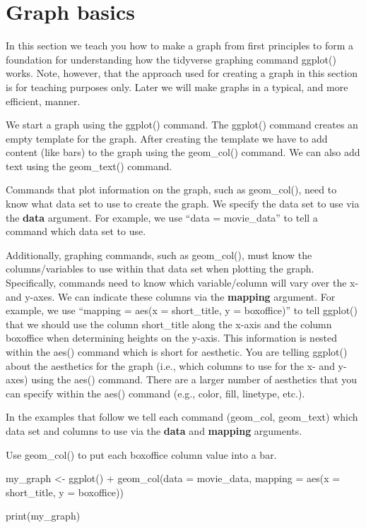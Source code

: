 \documentclass[
]{krantz}
\makeatletter
\newenvironment{Shaded}{\begin{snugshade}}{\end{snugshade}}
\newcommand{\AttributeTok}[1]{\textcolor[rgb]{0.61,0.61,0.61}{#1}}
\newcommand{\FunctionTok}[1]{\textcolor[rgb]{0,0,0}{#1}}
\newcommand{\NormalTok}[1]{#1}
\newcommand{\OtherTok}[1]{\textcolor[rgb]{0.37,0.37,0.37}{#1}}
\newcommand{\SpecialCharTok}[1]{\textcolor[rgb]{0,0,0}{#1}}
\newenvironment{kframe}{%
\medskip{}
\setlength{\fboxsep}{.8em}
 \def\at@end@of@kframe{}%
 \ifinner\ifhmode%
  \def\at@end@of@kframe{\end{minipage}}%
  \begin{minipage}{\columnwidth}%
 \fi\fi%
 \def\FrameCommand##1{\hskip\@totalleftmargin \hskip-\fboxsep
 \colorbox{shadecolor}{##1}\hskip-\fboxsep
     \hskip-\linewidth \hskip-\@totalleftmargin \hskip\columnwidth}%
 \MakeFramed {\advance\hsize-\width
   \@totalleftmargin\z@ \linewidth\hsize
   \@setminipage}}%
 {\par\unskip\endMakeFramed%
 \at@end@of@kframe}
\renewenvironment{Shaded}{\begin{kframe}}{\end{kframe}}
\makeatother
\begin{document}
\hypertarget{graph-basics}{%
\section{Graph basics}\label{graph-basics}}

In this section we teach you how to make a graph from first principles to form a foundation for understanding how the tidyverse graphing command ggplot() works. Note, however, that the approach used for creating a graph in this section is for teaching purposes only. Later we will make graphs in a typical, and more efficient, manner.

We start a graph using the ggplot() command. The ggplot() command creates an empty template for the graph. After creating the template we have to add content (like bars) to the graph using the geom\_col() command. We can also add text using the geom\_text() command.

Commands that plot information on the graph, such as geom\_col(), need to know what data set to use to create the graph. We specify the data set to use via the \textbf{data} argument. For example, we use ``data = movie\_data'' to tell a command which data set to use.

Additionally, graphing commands, such as geom\_col(), must know the columns/variables to use within that data set when plotting the graph. Specifically, commands need to know which variable/column will vary over the x- and y-axes. We can indicate these columns via the \textbf{mapping} argument. For example, we use ``mapping = aes(x = short\_title, y = boxoffice)'' to tell ggplot() that we should use the column short\_title along the x-axis and the column boxoffice when determining heights on the y-axis. This information is nested within the aes() command which is short for aesthetic. You are telling ggplot() about the aesthetics for the graph (i.e., which columns to use for the x- and y-axes) using the aes() command. There are a larger number of aesthetics that you can specify within the aes() command (e.g., color, fill, linetype, etc.).

In the examples that follow we tell each command (geom\_col, geom\_text) which data set and columns to use via the \textbf{data} and \textbf{mapping} arguments.

Use geom\_col() to put each boxoffice column value into a bar.

\begin{Shaded}
\begin{Highlighting}[]
\NormalTok{my\_graph }\OtherTok{\textless{}{-}} \FunctionTok{ggplot}\NormalTok{() }\SpecialCharTok{+}
  \FunctionTok{geom\_col}\NormalTok{(}\AttributeTok{data =}\NormalTok{ movie\_data,}
           \AttributeTok{mapping =} \FunctionTok{aes}\NormalTok{(}\AttributeTok{x =}\NormalTok{ short\_title, }
                         \AttributeTok{y =}\NormalTok{ boxoffice))}

\FunctionTok{print}\NormalTok{(my\_graph)}
\end{Highlighting}
\end{Shaded}
\end{document}
